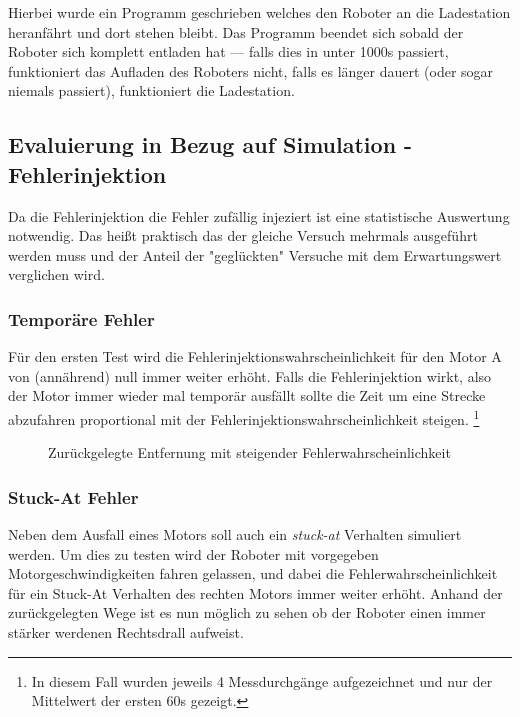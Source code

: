 {Hierbei wurde ein Programm geschrieben welches den Roboter an die Ladestation heranf{\"{a}}hrt und dort stehen bleibt. Das Programm
beendet sich sobald der Roboter sich komplett entladen hat --- falls dies in unter 1000s passiert, funktioniert das Aufladen des
Roboters nicht, falls es l{\"{a}}nger dauert (oder sogar niemals passiert), funktioniert die Ladestation.

\subsection{Evaluierung in Bezug auf Simulation - Fehlerinjektion}
Da die Fehlerinjektion die Fehler zuf{\"{a}}llig injeziert ist eine statistische Auswertung notwendig. Das hei{\ss}t praktisch das
der gleiche Versuch mehrmals ausgef{\"{u}}hrt werden muss und der Anteil der "gegl{\"{u}}ckten" Versuche mit dem Erwartungswert
verglichen wird.

\subsubsection{Tempor{\"{a}}re Fehler}
F{\"{u}}r den ersten Test wird die Fehlerinjektionswahrscheinlichkeit f{\"{u}}r den Motor A von (ann{\"{a}}hrend) null immer
weiter erh{\"{o}}ht. Falls die Fehlerinjektion wirkt, also der Motor immer wieder mal tempor{\"{a}}r ausf{\"{a}}llt sollte die
Zeit um eine Strecke abzufahren proportional mit der Fehlerinjektionswahrscheinlichkeit steigen.
\footnote{In diesem Fall wurden jeweils 4 Messdurchg{\"{a}}nge aufgezeichnet und nur der Mittelwert der ersten 60s gezeigt.}

\begin{figure}
	\centering
	\caption{Zur{\"{u}}ckgelegte Entfernung mit steigender Fehlerwahrscheinlichkeit}
	\label{fig:zemsf}
\end{figure}

\subsubsection{Stuck-At Fehler}
Neben dem Ausfall eines Motors soll auch ein \textit{stuck-at} Verhalten simuliert werden. Um dies zu testen wird der Roboter mit
vorgegeben Motorgeschwindigkeiten fahren gelassen, und dabei die Fehlerwahrscheinlichkeit f{\"{u}}r ein Stuck-At Verhalten des
rechten Motors immer weiter erh{\"{o}}ht. Anhand der zur{\"{u}}ckgelegten Wege ist es nun m{\"{o}}glich zu sehen ob der Roboter
einen immer st{\"{a}}rker werdenen Rechtsdrall aufweist.

}
